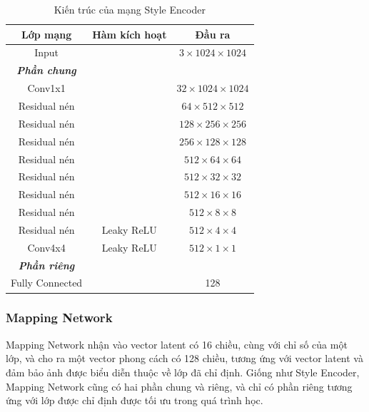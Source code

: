 \documentclass[12pt]{extreport}
\begin{document}
\begin{table}[H]
    \centering
    \begin{tabular}{c c c}
        Lớp mạng        & Hàm kích hoạt & Đầu ra                         \\
        \hline
        Input           &               & $ 3 \times 1024 \times 1024 $  \\
        \hline
        \textbf{\textit{Phần chung}}                                     \\
        Conv1x1         &               & $ 32 \times 1024 \times 1024 $ \\
        Residual nén    &               & $ 64 \times 512 \times 512 $   \\
        Residual nén    &               & $ 128 \times 256 \times 256 $  \\
        Residual nén    &               & $ 256 \times 128 \times 128 $  \\
        Residual nén    &               & $ 512 \times 64 \times 64 $    \\
        Residual nén    &               & $ 512 \times 32 \times 32 $    \\
        Residual nén    &               & $ 512 \times 16 \times 16 $    \\
        Residual nén    &               & $ 512 \times 8 \times 8 $      \\
        Residual nén    & Leaky ReLU    & $ 512 \times 4 \times 4 $      \\
        Conv4x4         & Leaky ReLU    & $ 512 \times 1 \times 1 $      \\
        \hline
        \textbf{\textit{Phần riêng}}                                     \\
        Fully Connected &               & 128
    \end{tabular}
    \caption{Kiến trúc của mạng Style Encoder}
\end{table}

\subsubsection{Mapping Network}

Mapping Network nhận vào vector latent có 16 chiều, cùng với chỉ số của một lớp, và cho ra một vector phong cách có 128 chiều, tương ứng với vector latent và đảm bảo ảnh được biểu diễn thuộc về lớp đã chỉ định. Giống như Style Encoder, Mapping Network cũng có hai phần chung và riêng, và chỉ có phần riêng tương ứng với lớp được chỉ định được tối ưu trong quá trình học.
\end{document}

